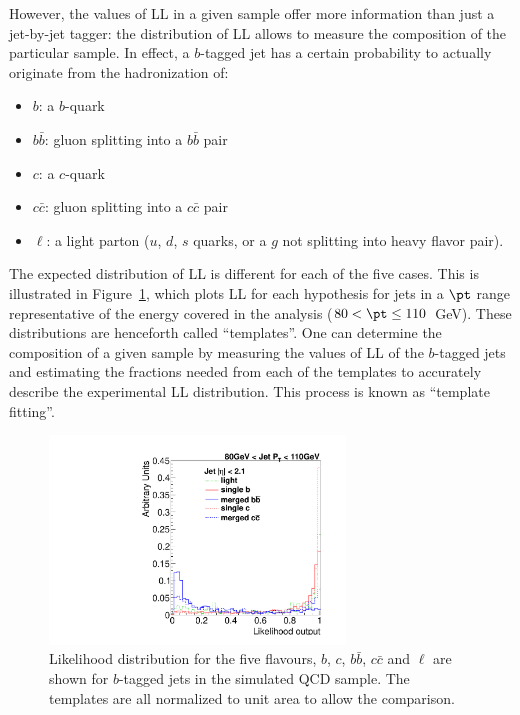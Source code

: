 However, the values of LL in a given sample offer more information than just a jet-by-jet tagger: the distribution of LL allows to measure the composition of the particular sample. In effect, a $b$-tagged jet has a certain probability to actually originate from the hadronization of:

\begin{itemize}
\item
$b$: a $b$-quark
\item
$b\bar{b}$: gluon splitting into a $b\bar{b}$ pair
\item
$c$: a $c$-quark
\item
$c\bar{c}$: gluon splitting into a $c\bar{c}$ pair
\item
$\ell$: a light parton ($u$, $d$, $s$ quarks, or a $g$ not splitting into heavy flavor pair).
\end{itemize}

The expected distribution of LL is different for each of the five cases. This is illustrated in Figure~\ref{fig:templates}, which plots LL for each hypothesis for jets in a $\pt$ range representative of the energy covered in the analysis ($80<\pt\leq110$~GeV). These distributions are henceforth called ``templates''. One can determine the composition of a given sample by measuring the values of LL of the $b$-tagged jets and estimating the fractions needed from each of the templates to accurately describe the experimental LL distribution. This process is known as ``template fitting''.

\begin{figure}[tp]
\centering
\includegraphics[width=0.70\textwidth]{FIGS/Fits/AllTemplates080.pdf}
\caption{Likelihood distribution for the five flavours, $b$, $c$, $b\bar{b}$, $c\bar{c}$ and $\ell$ are shown for $b$-tagged jets in the simulated QCD sample. The templates are all normalized to unit area to allow the comparison.}
\label{fig:templates}
\end{figure}




